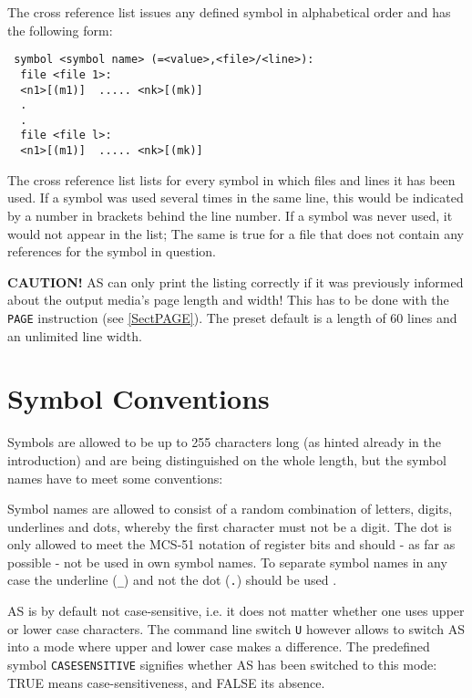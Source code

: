 \documentclass[12pt,twoside]{report}
\newcommand{\bb}[1]{{\bf #1}}
\newcommand{\tty}[1]{{\tt #1}}
\newcommand{\asname}{{AS}}
\begin{document}
The cross reference list issues any defined symbol in alphabetical
order and has the following form:
\begin{verbatim}
 symbol <symbol name> (=<value>,<file>/<line>):
  file <file 1>:
  <n1>[(m1)]  ..... <nk>[(mk)]
  .
  .
  file <file l>:
  <n1>[(m1)]  ..... <nk>[(mk)]
\end{verbatim}
The cross reference list lists for every symbol in which files and lines
it has been used.  If a symbol was used several times in the same line,
this would be indicated by a number in brackets behind the line number.
If a symbol was never used, it would not appear in the list; The same is
true for a file that does not contain any references for the symbol in
question.

\bb{CAUTION!}  \asname{} can only print the listing correctly if it was
previously informed about the output media's page length and width!
This has to be done with the \tty{PAGE} instruction (see \ref{SectPAGE}).  The
preset default is a length of 60 lines and an unlimited line width.


\section{Symbol Conventions}
\label{SectSymConv}

Symbols are allowed to be up to 255 characters long (as hinted already
in the introduction) and are being distinguished on the whole
length, but the symbol names have to meet some conventions:

Symbol names are allowed to consist of a random combination of
letters, digits, underlines and dots, whereby the first character must
not be a digit. The dot is only allowed to meet the MCS-51 notation of
register bits and should - as far as possible - not be used in own symbol
names.  To separate symbol names in any case the underline (\tty{\_}) and not
the dot (\tty{.}) should be used .

\asname{} is by default not case-sensitive, i.e. it does not matter whether
one uses upper or lower case characters.  The command line switch \tty{U}
however allows to switch \asname{} into a mode where upper and lower case
makes a difference.  The predefined symbol \tty{CASESENSITIVE} signifies
whether \asname{} has been switched to this mode: TRUE means case-sensitiveness,
and FALSE its absence.
\end{document}

